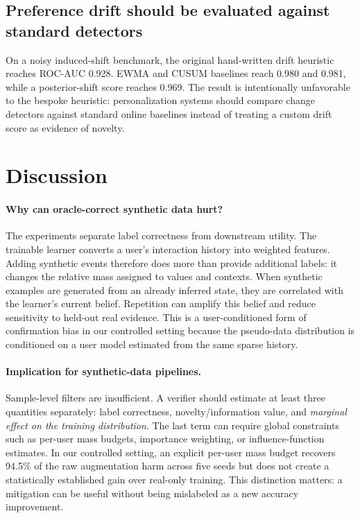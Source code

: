 \documentclass[10pt,twocolumn]{article}
\begin{document}
\subsection{Preference drift should be evaluated against standard detectors}
On a noisy induced-shift benchmark, the original hand-written drift heuristic reaches ROC-AUC 0.928. EWMA and CUSUM baselines reach 0.980 and 0.981, while a posterior-shift score reaches 0.969. The result is intentionally unfavorable to the bespoke heuristic: personalization systems should compare change detectors against standard online baselines instead of treating a custom drift score as evidence of novelty.

\section{Discussion}
\paragraph{Why can oracle-correct synthetic data hurt?}
The experiments separate label correctness from downstream utility. The trainable learner converts a user's interaction history into weighted features. Adding synthetic events therefore does more than provide additional labels: it changes the relative mass assigned to values and contexts. When synthetic examples are generated from an already inferred state, they are correlated with the learner's current belief. Repetition can amplify this belief and reduce sensitivity to held-out real evidence. This is a user-conditioned form of confirmation bias in our controlled setting because the pseudo-data distribution is conditioned on a user model estimated from the same sparse history.

\paragraph{Implication for synthetic-data pipelines.}
Sample-level filters are insufficient. A verifier should estimate at least three quantities separately: label correctness, novelty/information value, and \emph{marginal effect on the training distribution}. The last term can require global constraints such as per-user mass budgets, importance weighting, or influence-function estimates. In our controlled setting, an explicit per-user mass budget recovers 94.5\% of the raw augmentation harm across five seeds but does not create a statistically established gain over real-only training. This distinction matters: a mitigation can be useful without being mislabeled as a new accuracy improvement.
\end{document}
